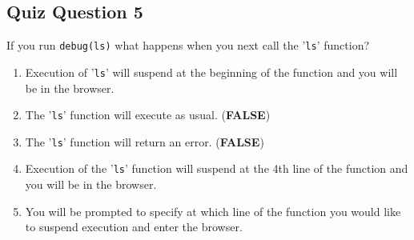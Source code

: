 \documentclass[12pt]{article}
\begin{document}

\subsection*{Quiz Question 5}
If you run
\texttt{debug(ls)}
what happens when you next call the '\texttt{ls}' function?
\begin{enumerate}
	\item Execution of '\texttt{ls}' will suspend at the beginning of the function and you will be in the browser.
	\item The '\texttt{ls}' function will execute as usual. (\textbf{FALSE})
	\item The '\texttt{ls}' function will return an error. (\textbf{FALSE})
	\item Execution of the '\texttt{ls}' function will suspend at the 4th line of the function and you will be in the browser.
	\item You will be prompted to specify at which line of the function you would like to suspend execution and enter the browser.
\end{enumerate}
\end{document}
